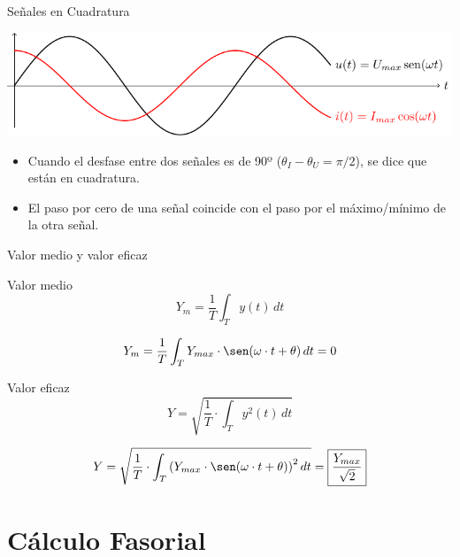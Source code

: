 \documentclass[aspectratio=169, usenames,svgnames,dvipsnames]{beamer}
\begin{document}
\begin{frame}[label={sec:orge95b8e8}]{Señales en Cuadratura}
\begin{center}
\includegraphics[width=.9\linewidth]{../figs/cuadratura.pdf}
\end{center}

\begin{itemize}
\item Cuando el desfase entre dos señales es de 90º (\(\theta_I - \theta_U = \pi/2\)), se dice que están en cuadratura.
\item El paso por cero de una señal coincide con el paso por el máximo/mínimo de la otra señal.
\end{itemize}
\end{frame}
\begin{frame}[label={sec:org1db20a9}]{Valor medio y valor eficaz}
\begin{block}{Valor medio}
\[
Y_m=\dfrac{1}{T}\int_{T} y(t)\, dt
\]

\[
Y_m=\dfrac{1}{T}\int_T Y_{max}\cdot\sen(\omega \cdot t+\theta)\, dt=0
\]
\end{block}
\begin{block}{Valor eficaz}
\[
Y = \sqrt{\dfrac{1}{T}\cdot\int_T y^{2}(t)\, dt}
\]

\[
Y=\sqrt{\dfrac{1}{T}\cdot\int_T \left(Y_{max}\cdot\sen(\omega\cdot t+\theta)\right)^{2}dt}=\boxed{\dfrac{Y_{max}}{\sqrt{2}}}
\]
\end{block}
\end{frame}
\section{Cálculo Fasorial}
\label{sec:org261c400}
\end{document}
